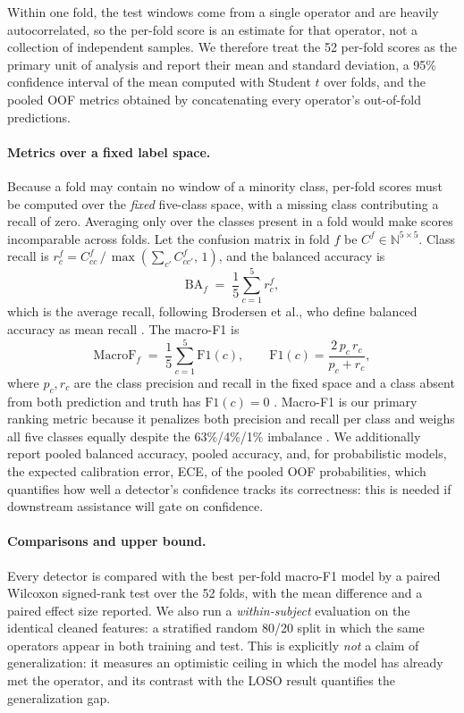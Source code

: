 \documentclass{llncs}
\begin{document}
Within one fold, the test windows come from a single operator and are heavily
autocorrelated, so the per-fold score is an estimate for that operator, not a
collection of independent samples. We therefore treat the 52 per-fold scores as the
primary unit of analysis and report their mean and standard deviation, a 95\%
confidence interval of the mean computed with Student $t$ over folds, and the pooled
\ac{OOF} metrics obtained by concatenating every operator's out-of-fold predictions.

\paragraph{Metrics over a fixed label space.}
Because a fold may contain no window of a minority class, per-fold scores must be
computed over the \emph{fixed} five-class space, with a missing class contributing a
recall of zero. Averaging only over the classes present in a fold would make scores
incomparable across folds. Let the confusion matrix in fold $f$ be $C^f \in
\mathbb{N}^{5\times5}$. Class recall is
$r^f_c = C^f_{cc}\,/\,\max(\sum_{c'} C^f_{cc'},\,1)$,
and the balanced accuracy is
\begin{equation}
\mathrm{BA}_f \;=\; \frac{1}{5}\sum_{c=1}^{5} r^f_c,
\label{eq:ba}
\end{equation}
which is the average recall, following Brodersen et al., who define balanced accuracy
as mean recall \cite{brodersen2010balanced}. The macro-F1 is
\begin{equation}
\mathrm{MacroF}_f \;=\; \frac{1}{5}\sum_{c=1}^{5} \mathrm{F1}(c),
\qquad
\mathrm{F1}(c)=\frac{2\,p_c\,r_c}{p_c+r_c},
\label{eq:macro}
\end{equation}
where $p_c,r_c$ are the class precision and recall in the fixed space and a class
absent from both prediction and truth has $\mathrm{F1}(c)=0$ \cite{sokolova2009systematic}.
Macro-F1 is our primary ranking metric because it penalizes both precision and recall
per class and weighs all five classes equally despite the 63\%/4\%/1\% imbalance
\cite{jeni2013imbalanced}. We additionally report pooled balanced accuracy, pooled
accuracy, and, for probabilistic models, the expected calibration error, ECE,
\cite{guo2017calibration} of the pooled \ac{OOF} probabilities, which quantifies how
well a detector's confidence tracks its correctness: this is needed if downstream
assistance will gate on confidence.

\paragraph{Comparisons and upper bound.}
Every detector is compared with the best per-fold macro-F1 model by a paired Wilcoxon
signed-rank test over the 52 folds, with the mean difference and a paired effect size
reported. We also run a \emph{within-subject} evaluation on the identical cleaned
features: a stratified random 80/20 split in which the same operators appear in both
training and test. This is explicitly \emph{not} a claim of generalization: it
measures an optimistic ceiling in which the model has already met the operator, and
its contrast with the \ac{LOSO} result quantifies the generalization gap.
\end{document}
